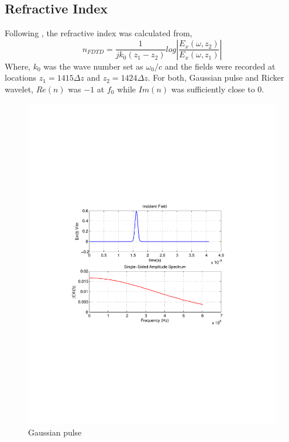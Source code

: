 \subsection{Refractive Index}
Following \cite{DNG-Ehud-Ziol}, the refractive index was calculated from,
\begin{equation}
n_{FDTD} = \dfrac{1}{jk_0(z_1-z_2)}log\left|\dfrac{E_x(\omega,z_2)}{E_x(\omega,z_1)}\right|
\label{Refractive-Index-FDTD}
\end{equation}
Where, $k_0$ was the wave number set as $\omega_0/c$ and the fields were recorded at locations $z_1=1415\Delta z$ and $z_2=1424\Delta z$. For both, Gaussian pulse and Ricker wavelet, $Re(n)$ was $-1$ at $f_0$ while $Im(n)$ was sufficiently close to $0$.
\begin{figure}[H]
\centering
\includegraphics[scale=0.8, trim=3.5cm 8.7cm 4.5cm 8.85cm, clip]{Figures/FigCh03_IncidentFieldGaussian.pdf}
\caption{Gaussian pulse}
\label{1DDNG-IncidentField-Gaussian}
\end{figure}
